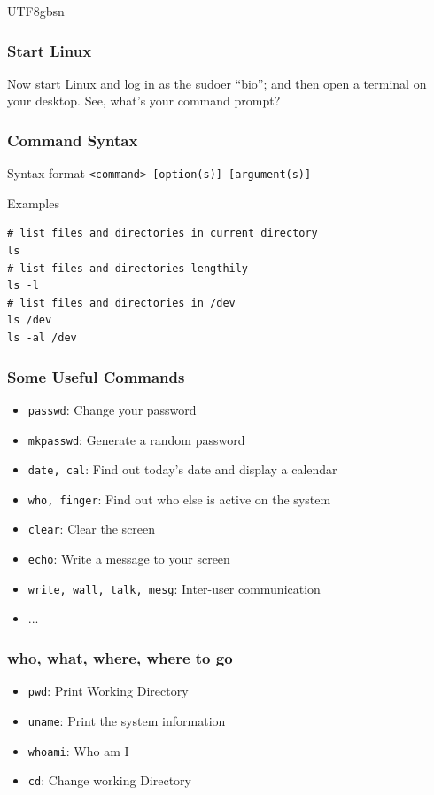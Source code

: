 \documentclass[red]{beamer}
\begin{document}
\begin{CJK*}{UTF8}{gbsn}
\begin{frame}
\frametitle{Start Linux}
\Large Now start Linux and log in as the sudoer ``bio''; and then open a 
	terminal on your desktop. See, what's your command prompt?
\end{frame}

\begin{frame}[t,fragile]
\frametitle{Command Syntax}
\begin{block}{Syntax format}
\lstinline{<command> [option(s)] [argument(s)]}
\end{block}

\begin{block}{Examples}
\begin{lstlisting}
# list files and directories in current directory
ls
# list files and directories lengthily
ls -l
# list files and directories in /dev
ls /dev
ls -al /dev
\end{lstlisting}
\end{block}
\end{frame}

\begin{frame}
\frametitle{Some Useful Commands}
\begin{itemize}
    \item \lstinline{passwd}: Change your password
    \item \lstinline{mkpasswd}: Generate a random password
    \item \lstinline{date, cal}: Find out today's date and display a calendar
    \item \lstinline{who, finger}: Find out who else is active on the system
    \item \lstinline{clear}: Clear the screen
    \item \lstinline{echo}: Write a message to your screen
    \item \lstinline{write, wall, talk, mesg}: Inter-user communication
    \item ...
\end{itemize}
\end{frame}

\begin{frame}
\frametitle{who, what, where, where to go}
\begin{itemize}
    \item \lstinline{pwd}: Print Working Directory
    \item \lstinline{uname}: Print the system information
    \item \lstinline{whoami}: Who am I
    \item \lstinline{cd}: Change working Directory
\end{itemize}
\end{frame}


\end{CJK*}
\end{document}
